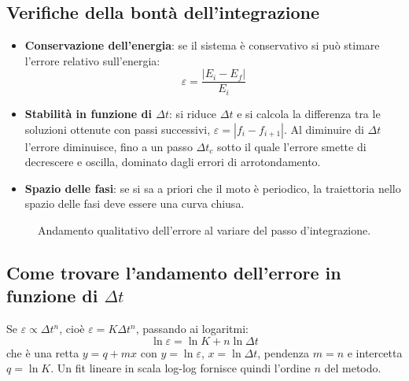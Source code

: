 \documentclass[11pt, a4paper, openright]{book}
\theoremstyle{plain}
\theoremstyle{definition}
\theoremstyle{remark}
\begin{document}
\subsection{Verifiche della bontà dell'integrazione}
\begin{itemize}
    \item \textbf{Conservazione dell'energia}: se il sistema è conservativo si può stimare l'errore relativo sull'energia:
    \begin{equation}
        \varepsilon = \frac{|E_i - E_f|}{E_i}
    \end{equation}
    \item \textbf{Stabilità in funzione di $\Delta t$}: si riduce $\Delta t$ e si calcola la differenza tra le soluzioni ottenute con passi successivi, $\varepsilon = |f_i - f_{i + 1}|$. Al diminuire di $\Delta t$ l'errore diminuisce, fino a un passo $\Delta t_c$ sotto il quale l'errore smette di decrescere e oscilla, dominato dagli errori di arrotondamento.
    \item \textbf{Spazio delle fasi}: se si sa a priori che il moto è periodico, la traiettoria nello spazio delle fasi deve essere una curva chiusa.
\end{itemize}

\begin{figure}[H]
    \centering
    \caption{Andamento qualitativo dell'errore al variare del passo d'integrazione.}
\end{figure}

\subsection{Come trovare l'andamento dell'errore in funzione di $\Delta t$}
Se $\varepsilon \propto \Delta t^n$, cioè $\varepsilon = K\Delta t^n$, passando ai logaritmi:
\begin{equation}
    \ln\varepsilon = \ln K + n\ln\Delta t
\end{equation}
che è una retta $y = q + mx$ con $y = \ln\varepsilon$, $x = \ln\Delta t$, pendenza $m = n$ e intercetta $q = \ln K$. Un fit lineare in scala log-log fornisce quindi l'ordine $n$ del metodo.
\end{document}

